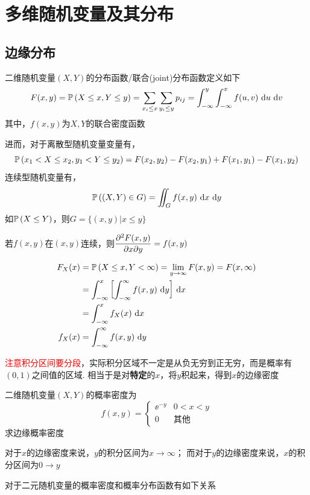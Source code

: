 
\section{多维随机变量及其分布}
\subsection{边缘分布}
\begin{definition}
二维随机变量$(X,Y)$的分布函数/联合(joint)分布函数定义如下
\[F(x,y)=\mathbb{P}\left(X\leq x,Y\leq y\right)=\displaystyle\sum_{x_i\leq x}\sum_{y_i\leq y}p_{ij}=\displaystyle\int_{-\infty}^{y}\int_{-\infty}^{x}f(u,v)\,\,\mathrm{d} u\,\,\mathrm{d} v\]
其中，$f(x,y)$为$X,Y$的联合密度函数
\end{definition}
进而，对于离散型随机变量变量有，
\[\mathbb{P}\left(x_1<X\leq x_2,y_1<Y\leq y_2\right)=F(x_2,y_2)-F(x_2,y_1)+F(x_1,y_1)-F(x_1,y_2)\]
连续型随机变量有，
\[\mathbb{P}\left((X,Y)\in G\right)=\iint_G f(x,y)\,\,\mathrm{d} x\,\,\mathrm{d} y\]
如$\mathbb{P}\left(X\leq Y\right)$，则$G=\{(x,y)|x\leq y\}$
\par 若$f(x,y)$在$(x,y)$连续，则$\dfrac{\partial^2 F(x,y)}{\partial x\partial y}=f(x,y)$

\begin{definition}[边缘(marginal)分布]
\[\begin{aligned}
F_X(x)&=\mathbb{P}\left(X\leq x,Y<\infty\right)=\lim_{y\to\infty}F(x,y)=F(x,\infty)\\
&=\displaystyle\int_{-\infty}^{x}{\left[\displaystyle\int_{-\infty}^{\infty}{f(x,y)}\,\,\mathrm{d} y\right]}\,\,\mathrm{d} x\\
&=\displaystyle\int_{-\infty}^{x}{f_X(x)}\,\,\mathrm{d} x\\
f_X(x)&=\displaystyle\int_{-\infty}^{\infty}{f(x,y)}\,\,\mathrm{d} y
\end{aligned}\]
\end{definition}
\textcolor{red}{注意积分区间要分段}，实际积分区域不一定是从负无穷到正无穷，而是概率有$(0,1)$之间值的区域.
相当于是对\textbf{特定}的$x$，将$y$积起来，得到$x$的边缘密度
\begin{example}
二维随机变量$(X,Y)$的概率密度为
\[f(x,y)=\begin{cases}\ee^{-y}&0<x<y\\0&\text{其他}\end{cases}\]
求边缘概率密度
\end{example}
\begin{analysis}
对于$x$的边缘密度来说，$y$的积分区间为$x\to\infty$；
而对于$y$的边缘密度来说，$x$的积分区间为$0\to y$
\end{analysis}

对于二元随机变量的概率密度和概率分布函数有如下关系
\begin{center}
\end{center}

